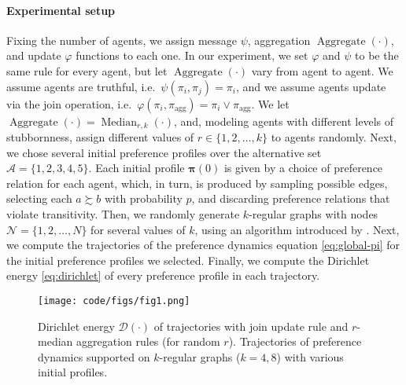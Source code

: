 \documentclass[conference]{ieeeconf}
\newcommand{\N}{\mathcal{N}}
\newcommand{\A}{\mathcal{A}}
\newcommand{\D}{\mathcal{D}}
\newcommand{\prefers}{\succsim}
\newcommand{\profile}{\boldsymbol{\pi}}
\newcommand{\join}{\vee}
\DeclareMathOperator{\Aggregate}{Aggregate}
\DeclareMathOperator{\Median}{Median}
\begin{document}
\paragraph*{Experimental setup}
 Fixing the number of agents, we assign message $\psi$, aggregation $\Aggregate(\cdot)$, and update $\varphi$ functions to each one. In our experiment, we set $\varphi$ and $\psi$ to be the same rule for every agent, but let $\Aggregate(\cdot)$ vary from agent to agent. We assume agents are truthful, i.e.~$\psi(\pi_i,\pi_j) = \pi_i$, and we assume agents update via the join operation, i.e.~$\varphi(\pi_i,\pi_{\mathrm{agg}}) = \pi_i \join \pi_{\mathrm{agg}}$. We let $\Aggregate(\cdot) = \Median_{r,k}(\cdot)$, and, modeling agents with different levels of stubbornness, assign different values of $r \in \{1,2,\dots,k\}$ to agents randomly. Next, we chose several initial preference profiles over the alternative set $\A = \{1,2,3,4,5\}$. Each initial profile $\profile(0)$ is given by a choice of preference relation for each agent, which, in turn, is produced by sampling possible edges, selecting each $a \prefers b$ with probability $p$, and discarding preference relations that violate transitivity. Then, we randomly generate $k$-regular graphs with nodes $\N = \{1,2,\dots,N\}$ for several values of $k$, using an algorithm introduced by \cite{kim2003}. Next, we compute the trajectories of the preference dynamics equation \eqref{eq:global-pi} for the initial preference profiles we selected. Finally, we compute the Dirichlet energy \eqref{eq:dirichlet} of every preference profile in each trajectory.

 \begin{figure}
    \centering
    \texttt{[image: code/figs/fig1.png]}
    \caption{Dirichlet energy $\D(\cdot)$ of trajectories with join update rule and $r$-median aggregation rules (for random $r$). Trajectories of preference dynamics supported on $k$-regular graphs ($k=4,8$) with various initial profiles.}
    \label{fig:1}
\end{figure}
\end{document}
